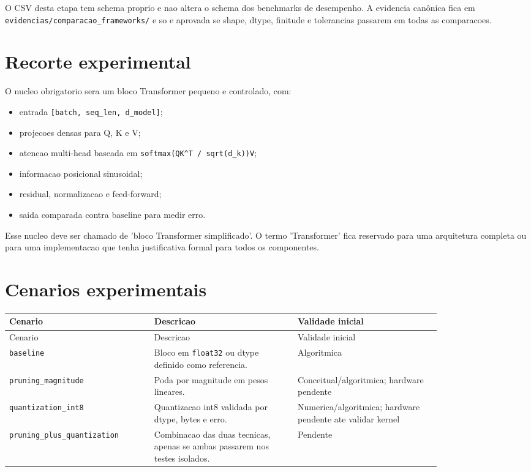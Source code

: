 O CSV desta etapa tem schema proprio e nao altera o schema dos benchmarks de desempenho. A evidencia canônica fica em \texttt{evidencias/\allowbreak{}comparacao\_\allowbreak{}frameworks/\allowbreak{}} e so e aprovada se shape, dtype, finitude e tolerancias passarem em todas as comparacoes.



\section{Recorte experimental}



O nucleo obrigatorio sera um bloco Transformer pequeno e controlado, com:


\begin{itemize}
\item entrada \texttt{[batch, seq\_\allowbreak{}len, d\_\allowbreak{}model]};
\item projecoes densas para Q, K e V;
\item atencao multi-head baseada em \texttt{softmax(QK\textasciicircum{}T /\allowbreak{} sqrt(d\_\allowbreak{}k))V};
\item informacao posicional sinusoidal;
\item residual, normalizacao e feed-forward;
\item saida comparada contra baseline para medir erro.
\end{itemize}




Esse nucleo deve ser chamado de 'bloco Transformer simplificado'. O termo 'Transformer' fica reservado para uma arquitetura completa ou para uma implementacao que tenha justificativa formal para todos os componentes.



\section{Cenarios experimentais}



\begin{longtable}{@{}>{\RaggedRight\arraybackslash}p{0.273\linewidth}>{\RaggedRight\arraybackslash}p{0.273\linewidth}>{\RaggedRight\arraybackslash}p{0.273\linewidth}@{}}
\toprule
Cenario & Descricao & Validade inicial \\
\midrule
\endfirsthead
\toprule
Cenario & Descricao & Validade inicial \\
\midrule
\endhead
\texttt{baseline} & Bloco em \texttt{float32} ou dtype definido como referencia. & Algoritmica \\
\texttt{pruning\_\allowbreak{}magnitude} & Poda por magnitude em pesos lineares. & Conceitual/algoritmica; hardware pendente \\
\texttt{quantization\_\allowbreak{}int8} & Quantizacao int8 validada por dtype, bytes e erro. & Numerica/algoritmica; hardware pendente ate validar kernel \\
\texttt{pruning\_\allowbreak{}plus\_\allowbreak{}quantization} & Combinacao das duas tecnicas, apenas se ambas passarem nos testes isolados. & Pendente \\
\bottomrule
\end{longtable}

